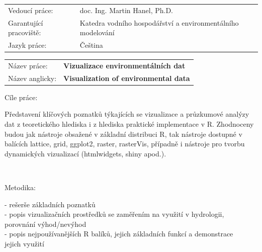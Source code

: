 \documentclass[usenames,dvipsnames,oneside,10.9pt]{article}
\begin{document}
\vspace*{2mm}

\hspace*{-3cm}
\begin{tabular}{ll}

\noalign{\vspace{2mm}}
Vedoucí práce: \hspace*{1.55cm} & doc. Ing. Martin Hanel, Ph.D. \\
\noalign{\vspace{2mm}}
Garantující pracoviště: \hspace*{1.55cm} & Katedra vodního hospodářství a environmentálního modelování \\
\noalign{\vspace{2mm}}
Jazyk práce: \hspace*{1.55cm} & Čeština \\
\end{tabular}

\vspace*{0.35cm}

\hspace*{-3cm}
\begin{tabular}{ll}

\noalign{\vspace{2mm}}
Název práce: \hspace*{1.2cm} & {\large \textbf{Vizualizace environmentálních dat}} \\
\noalign{\vspace{3mm}}
Název anglicky: \hspace*{2.1cm} & \textbf{Visualization of environmental data} \\
\end{tabular}

\vspace*{4mm}

\hspace*{-2.7cm} Cíle práce: \hspace*{3.3cm} \parbox[t]{0.95\textwidth}{Představení klíčových poznatků týkajících se vizualizace a průzkumové analýzy dat z teoretického hlediska i z hlediska praktické implementace v R. Zhodnoceny budou jak nástroje obsažené v základní distribuci R, tak nástroje dostupné v balících lattice, grid, ggplot2, raster, rasterVis, případně i nástroje pro tvorbu dynamických vizualizací (htmlwidgets, shiny apod.).} \\

\vspace*{3mm}

\hspace*{-2.7cm} Metodika: \hspace*{3.3cm} \parbox[t]{0.95\textwidth}{- rešerše základních poznatků \\
- popis vizualizačních prostředků se zaměřením na využití v hydrologii, \\
\hspace*{2mm}porovnání výhod/nevýhod \\
- popis nejpoužívanějších R balíků, jejich základních funkcí a demonstrace\\
\hspace*{2mm}jejich využití} \\
\end{document}
